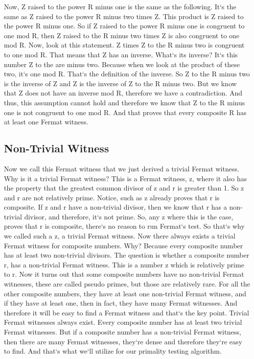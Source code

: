 Now, Z raised to the power R minus one is the same as the following.
It`s the same as Z raised to the power R minus two times Z\@.
This product is Z raised to the power R minus one.
So if Z raised to the power R minus one is congruent to one mod R, then Z raised to the R minus two times Z is also congruent to one mod R\@.
Now, look at this statement.
Z times Z to the R minus two is congruent to one mod R\@.
That means that Z has an inverse.
What`s its inverse? It`s this number Z to the are minus two.
Because when we look at the product of these two, it`s one mod R\@.
That`s the definition of the inverse.
So Z to the R minus two is the inverse of Z and Z is the inverse of Z to the R minus two.
But we know that Z does not have an inverse mod R, therefore we have a contradiction.
And thus, this assumption cannot hold and therefore we know that Z to the R minus one is not congruent to one mod R\@.
And that proves that every composite R has at least one Fermat witness.

\subsection{Non-Trivial Witness}
Now we call this Fermat witness that we just derived a trivial Fermat witness.
Why is it a trivial Fermat witness? This is a Fermat witness, z, where it also has the property that the greatest common divisor of z and r is greater than 1.
So z and r are not relatively prime.
Notice, such as z already proves that r is composite.
If z and r have a non-trivial divisor, then we know that r has a non-trivial divisor, and therefore, it`s not prime.
So, any z where this is the case, proves that r is composite, there`s no reason to run Fermat`s test.
So that`s why we called such a z, a trivial Fermat witness.
Now there always exists a trivial Fermat witness for composite numbers.
Why? Because every composite number has at least two non-trivial divisors.
The question is whether a composite number r, has a non-trivial Fermat witness.
This is a number z which is relatively prime to r.
Now it turns out that some composite numbers have no non-trivial Fermat witnesses, these are called pseudo primes, but those are relatively rare.
For all the other composite numbers, they have at least one non-trivial Fermat witness, and if they have at least one, then in fact, they have many Fermat witnesses.
And therefore it will be easy to find a Fermat witness and that`s the key point.
Trivial Fermat witnesses always exist.
Every composite number has at least two trivial Fermat witnesses.
But if a composite number has a non-trivial Fermat witness, then there are many Fermat witnesses, they`re dense and therefore they`re easy to find.
And that`s what we`ll utilize for our primality testing algorithm.

